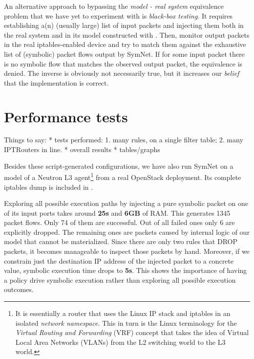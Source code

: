 An alternative approach to bypassing the \emph{model - real system} equivalence
problem that we have yet to experiment with is \emph{black-box testing}.  It
requires establishing a(n) (usually large) list of input packets and injecting
them both in the real system and in its model constructed with \TOOL.  Then,
monitor output packets in the real iptables-enabled device and try to match
them against the exhaustive list of (symbolic) packet flows output by SymNet.
If for some input packet there is no symbolic flow that matches the observed
output packet, the equivalence is denied.  The inverse is obviously not
necessarily true, but it increases our \emph{belief} that the implementation is
correct.


\section{Performance tests}


Things to say:
* tests performed:
1. many rules, on a single filter table;
2. many IPTRouters in line.
* overall results
* tables/graphs

\bigskip

Besides these script-generated configurations, we have also run SymNet on a
model of a Neutron L3 agent\footnote{It is essentially a router that uses the
Linux IP stack and iptables in an isolated \emph{network namespace}.  This in
turn is the Linux terminology for the \emph{Virtual Routing and Forwarding}
(VRF) concept that takes the idea
of Virtual Local Area Networks (VLANs)
from the L2 switching world to the L3 world.} from a real OpenStack deployment.
Its complete iptables dump is included in
.

Exploring all possible execution paths by injecting a pure symbolic packet on
one of its input ports takes around \textbf{25s} and \textbf{6GB} of RAM.  This
generates 1345 packet flows.  Only 74 of them are successful.  Out of all
failed ones only 6 are explicitly dropped.  The remaining ones are packets
caused by internal logic of our model that cannot be materialized.  Since there
are only two rules that DROP packets, it becomes manageable to inspect those
packets by hand.  Moreover, if we constrain just the destination IP address of
the injected packet to a concrete value, symbolic execution time drops to
\textbf{5s}.  This shows the importance of having a policy drive symbolic
execution rather than exploring all possible execution outcomes.

